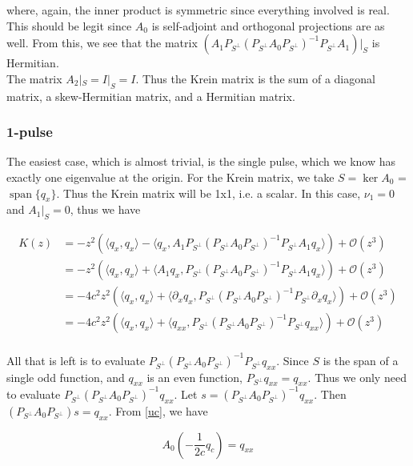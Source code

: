 \documentclass[12pt]{article}
\DeclareMathOperator{\spn}{span}
\begin{document}
where, again, the inner product is symmetric since everything involved is real. This should be legit since $A_0$ is self-adjoint and orthogonal projections are as well. From this, we see that the matrix $\left( A_1 P_{S^\perp} (P_{S^\perp} A_0 P_{S^\perp})^{-1} P_{S^\perp} A_1 \right)|_S$ is Hermitian.\\

The matrix $A_2|_S = I|_S = I$. Thus the Krein matrix is the sum of a diagonal matrix, a skew-Hermitian matrix, and a Hermitian matrix.

\subsubsection{1-pulse}

The easiest case, which is almost trivial, is the single pulse, which we know has exactly one eigenvalue at the origin. For the Krein matrix, we take $S = \ker A_0$ = $\spn \{q_x\}$. Thus the Krein matrix will be 1x1, i.e. a scalar. In this case, $\nu_1 = 0$ and $A_1|_S = 0$, thus we have

\begin{align*}
K(z) &= -z^2\left( \langle q_x, q_x \rangle - \langle q_x, A_1 P_{S^\perp} (P_{S^\perp} A_0 P_{S^\perp})^{-1} P_{S^\perp} A_1 q_x \rangle \right) + \mathcal{O}(z^3) \\
&= -z^2\left( \langle q_x, q_x \rangle + \langle A_1 q_x, P_{S^\perp} (P_{S^\perp} A_0 P_{S^\perp})^{-1} P_{S^\perp} A_1 q_x \rangle \right) + \mathcal{O}(z^3) \\
&= -4 c^2 z^2\left( \langle q_x, q_x \rangle + \langle \partial_x q_x, P_{S^\perp} (P_{S^\perp} A_0 P_{S^\perp})^{-1} P_{S^\perp} \partial_x q_x \rangle \right) + \mathcal{O}(z^3) \\
&= -4 c^2 z^2\left( \langle q_x, q_x \rangle + \langle q_{xx}, P_{S^\perp} (P_{S^\perp} A_0 P_{S^\perp})^{-1} P_{S^\perp} q_{xx} \rangle \right) + \mathcal{O}(z^3) \\
\end{align*}

All that is left is to evaluate $P_{S^\perp} (P_{S^\perp} A_0 P_{S^\perp})^{-1} P_{S^\perp} q_{xx}$. Since $S$ is the span of a single odd function, and $q_{xx}$ is an even function, $P_{S^\perp} q_{xx} = q_{xx}$. Thus we only need to evaluate $P_{S^\perp} (P_{S^\perp} A_0 P_{S^\perp})^{-1} q_{xx}$. Let $s = (P_{S^\perp} A_0 P_{S^\perp})^{-1} q_{xx}$. Then $(P_{S^\perp} A_0 P_{S^\perp}) s = q_{xx}$. From \eqref{uc}, we have

\begin{equation*}\label{uc}
A_0 \left( -\frac{1}{2c} q_c \right) = q_{xx}
\end{equation*}
\end{document}
